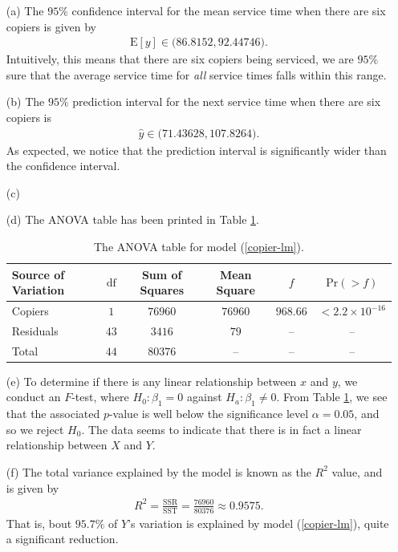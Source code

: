 \documentclass[10pt]{article}
\begin{document}
\begin{itemize}
    \item[(a)] The \(95\%{}\) confidence interval for the mean service time when there are six copiers is given by 
    \begin{align*}
        \mathrm{E}[y] \in \Big(86.8152, 92.44746 \Big).
    \end{align*}
    Intuitively, this means that there are six copiers being serviced, we are \(95\%{}\) sure that the average service time for 
    \textsl{all} service times falls within this range. 
    \item[(b)] The \(95\%{}\) prediction interval for the next service time when there are six copiers is 
    \begin{align*}
        \widehat{y} \in \Big( 71.43628, 107.8264 \Big).
    \end{align*}
    As expected, we notice that the prediction interval is significantly wider than the confidence interval. 
    \item[(c)] 
    \item[(d)] The ANOVA table has been printed in Table \ref{copier-anova}.
    \begin{table}
        \centering
        \def\arraystretch{1.25}
        \begin{tabular}[ht]{lccccc} \toprule
            Source of Variation & \(\mathrm{df}\) & Sum of Squares & Mean Square & \(f\) & \(\mathrm{Pr}(> f)\) \\\midrule
            Copiers & \(1\) & \(76960\) & \(76960\) & \(968.66\) & \(< 2.2 \times 10^{-16}\) \\
            Residuals & \(43\) & \(3416\) & \(79\) & -- & -- \\
            Total & \(44\) & \(80376\) & -- & -- & -- \\\bottomrule
        \end{tabular}
        \caption{The ANOVA table for model (\ref{copier-lm}).}
        \label{copier-anova}
    \end{table}
    \item[(e)] To determine if there is any linear relationship between \(x\) and \(y\), we conduct an \(F\)-test, where 
    \(H_0 : \beta_1 = 0\) against \(H_a : \beta_1 \neq 0\). From Table \ref{copier-anova}, we see that the associated \(p\)-value is 
    well below the significance level \(\alpha = 0.05\), and so we reject \(H_0\). The data seems to indicate that there is in fact a 
    linear relationship between \(X\) and \(Y\).
    \item[(f)] The total variance explained by the model is known as the \(R^2\) value, and is given by
    \begin{align*}
        R^2 = \frac{\mathrm{SSR}}{\mathrm{SST}} = \frac{76960}{80376} \approx 0.9575.
    \end{align*}
    That is, bout \(95.7\%{}\) of \(Y\)'s variation is explained by model (\ref{copier-lm}), quite a significant reduction. 
\end{itemize}
\end{document}
